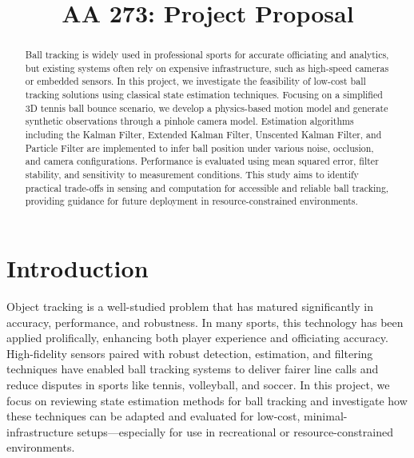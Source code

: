 \documentclass[conference]{IEEEtran}
\begin{document}
\title{AA 273: Project Proposal
}

\author{
\and
{}
}

\maketitle

\begin{abstract}
Ball tracking is widely used in professional sports for accurate officiating and analytics, but existing systems often rely on expensive infrastructure, such as high-speed cameras or embedded sensors. In this project, we investigate the feasibility of low-cost ball tracking solutions using classical state estimation techniques. Focusing on a simplified 3D tennis ball bounce scenario, we develop a physics-based motion model and generate synthetic observations through a pinhole camera model. Estimation algorithms including the Kalman Filter, Extended Kalman Filter, Unscented Kalman Filter, and Particle Filter are implemented to infer ball position under various noise, occlusion, and camera configurations. Performance is evaluated using mean squared error, filter stability, and sensitivity to measurement conditions. This study aims to identify practical trade-offs in sensing and computation for accessible and reliable ball tracking, providing guidance for future deployment in resource-constrained environments.
\end{abstract}

\section{Introduction}
Object tracking is a well-studied problem that has matured significantly in accuracy, performance, and robustness. In many sports, this technology has been applied prolifically, enhancing both player experience and officiating accuracy. High-fidelity sensors paired with robust detection, estimation, and filtering techniques have enabled ball tracking systems to deliver fairer line calls and reduce disputes in sports like tennis, volleyball, and soccer. In this project, we focus on reviewing state estimation methods for ball tracking and investigate how these techniques can be adapted and evaluated for low-cost, minimal-infrastructure setups—especially for use in recreational or resource-constrained environments.
\end{document}
